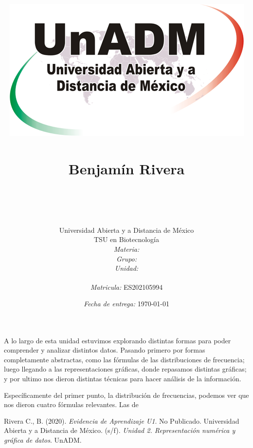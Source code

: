 \documentclass[14pt]{article}
\title{
	\includegraphics{../../../assets/logo-unadm} \\
	\ \\ Benjam\'in Rivera \\
	\bf{\titulo}\\\ \\}
\author{
	Universidad Abierta y a Distancia de México \\
	TSU en Biotecnolog\'ia \\
	\textit{Materia:} \materia \\
	\textit{Grupo:} \grupo \\
	\textit{Unidad:} \unidad \\
	\\
	\textit{Matricula:} ES202105994 }
\date{\textit{Fecha de entrega:} \today}
\begin{document}
\maketitle\newpage

	\par A lo largo de esta unidad estuvimos explorando distintas formas para poder comprender y analizar distintos datos. Pasando primero por formas completamente abstractas, como las fórmulas de las distribuciones de frecuencia; luego llegando a las representaciones gráficas, donde repasamos distintas gráficas; y por ultimo nos dieron distintas técnicas para hacer análisis de la información.
	
	\par Específicamente del primer punto, la distribución de frecuencias, podemos ver que nos dieron cuatro fórmulas relevantes. Las de 
	

\begin{thebibliography}{X}
	 Rivera C., B. (2020). \textit{Evidencia de Aprendizaje U1}. No Publicado.
	 Universidad Abierta y a Distancia de México. (s/f). \textit{Unidad 2. Representación numérica y gráfica de datos}. UnADM.

 
\end{thebibliography}
\end{document}

